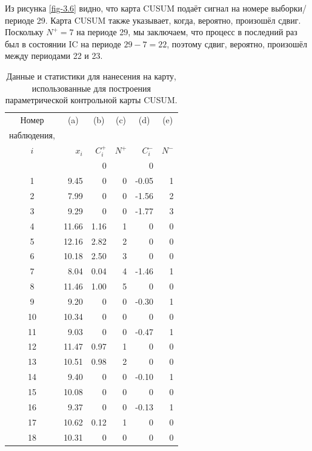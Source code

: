 Из рисунка \ref{fig-3.6} видно, что карта CUSUM подаёт сигнал на номере выборки/периоде 29. Карта CUSUM также указывает, когда, вероятно, произошёл сдвиг. Поскольку \(N^+ = 7\) на периоде 29, мы заключаем, что процесс в последний раз был в состоянии IC на периоде \(29 - 7 = 22\), поэтому сдвиг, вероятно, произошёл между периодами 22 и 23.

\begin{table}[htbp]
	\centering
	\caption{Данные и статистики для нанесения на карту, использованные для построения параметрической контрольной карты CUSUM.}
	\label{tab:3.6}
	\small %
	\setlength{\tabcolsep}{5pt} %
	\renewcommand{\arraystretch}{1.0} %
	
	\begin{tabular}{c r r r r r}
		\toprule
		Номер & \multicolumn{1}{c}{(a)} & \multicolumn{1}{c}{(b)} & \multicolumn{1}{c}{(c)} & \multicolumn{1}{c}{(d)} & \multicolumn{1}{c}{(e)} \\
		наблюдения, & & & & & \\
		\(i\) & \(x_i\) & \(C_i^+\) & \(N^+\) & \(C_i^-\) & \(N^-\) \\
		\midrule
		& & 0 & & 0 & \\
		1  & 9.45  & 0 & 0 & -0.05 & 1 \\
		2  & 7.99  & 0 & 0 & -1.56 & 2 \\
		3  & 9.29  & 0 & 0 & -1.77 & 3 \\
		4  & 11.66 & 1.16 & 1 & 0 & 0 \\
		5  & 12.16 & 2.82 & 2 & 0 & 0 \\
		6  & 10.18 & 2.50 & 3 & 0 & 0 \\
		7  & 8.04  & 0.04 & 4 & -1.46 & 1 \\
		8  & 11.46 & 1.00 & 5 & 0 & 0 \\
		9  & 9.20  & 0 & 0 & -0.30 & 1 \\
		10 & 10.34 & 0 & 0 & 0 & 0 \\
		11 & 9.03  & 0 & 0 & -0.47 & 1 \\
		12 & 11.47 & 0.97 & 1 & 0 & 0 \\
		13 & 10.51 & 0.98 & 2 & 0 & 0 \\
		14 & 9.40  & 0 & 0 & -0.10 & 1 \\
		15 & 10.08 & 0 & 0 & 0 & 0 \\
		16 & 9.37  & 0 & 0 & -0.13 & 1 \\
		17 & 10.62 & 0.12 & 1 & 0 & 0 \\
		18 & 10.31 & 0 & 0 & 0 & 0 \\

\end{tabular}
\end{table}
